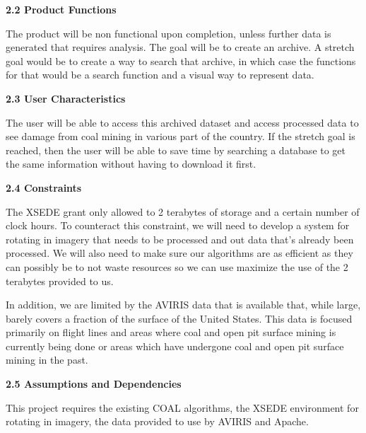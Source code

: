 \documentclass[a4paper,12pt]{article}
\begin{document}
\noindent \textbf{2.2 Product Functions}\newline


\noindent The product will be non functional upon completion, unless further data is generated that requires analysis. The goal will be to create an archive. A stretch goal would be to create a way to search that archive, in which case the functions for that would be a search function and a visual way to represent data. \newline


\noindent \textbf{2.3 User Characteristics}\newline


\noindent The user will be able to access this archived dataset and access processed data to see damage from coal mining in various part of the country. If the stretch goal is reached, then the user will be able to save time by searching a database to get the same information without having to download it first.\newline


\noindent \textbf{2.4 Constraints}\newline


\noindent The XSEDE grant only allowed to 2 terabytes of storage and a certain number of clock hours. To counteract this constraint, we will need to develop a system for rotating in imagery that needs to be processed and out data that's already been processed. We will also need to make sure our algorithms are as efficient as they can possibly be to not waste resources so we can use maximize the use of the 2 terabytes provided to us.\newline


\noindent In addition, we are limited by the AVIRIS data that is available that, while large, barely covers a fraction of the surface of the United States. This data is focused primarily on flight lines and areas where coal and open pit surface mining is currently being done or areas which have undergone coal and open pit surface mining in the past. \newline


\noindent \textbf{2.5 Assumptions and Dependencies}\newline


\noindent This project requires the existing COAL algorithms, the XSEDE environment for rotating in imagery, the data provided to use by AVIRIS and Apache.\newline


\newline
\end{document}
